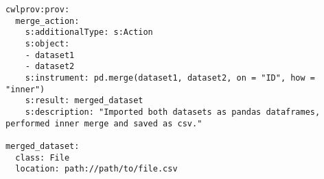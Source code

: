 \begin{verbatim}
cwlprov:prov:
  merge_action:
    s:additionalType: s:Action
    s:object:
    - dataset1
    - dataset2
    s:instrument: pd.merge(dataset1, dataset2, on = "ID", how = "inner")
    s:result: merged_dataset
    s:description: "Imported both datasets as pandas dataframes, performed inner merge and saved as csv."

merged_dataset:
  class: File
  location: path://path/to/file.csv
\end{verbatim}